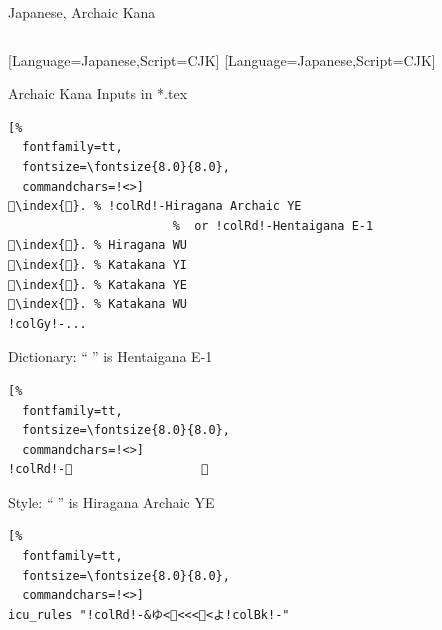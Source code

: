 \documentclass[aspectratio=169,10pt]{beamer}
\begin{document}

\begin{frame}[fragile]{Japanese, Archaic Kana}

\begin{columns}
\begin{column}{55mm}

\setmonofont{mkanaplus-regular.ttf}[Language=Japanese,Script=CJK]
\setsansfont{mkanaplus-regular.ttf}[Language=Japanese,Script=CJK]
\begin{exampleblock}{Archaic Kana Inputs in *.tex}
\begin{Verbatim}[%
  fontfamily=tt,
  fontsize=\fontsize{8.0}{8.0},
  commandchars=!<>]
𛀁\index{𛀁}. % !colRd!-Hiragana Archaic YE
                       %  or !colRd!-Hentaigana E-1
𛄟\index{𛄟}. % Hiragana WU
𛄠\index{𛄠}. % Katakana YI
𛄡\index{𛄡}. % Katakana YE
𛄢\index{𛄢}. % Katakana WU
!colGy!-...
\end{Verbatim}
\end{exampleblock}
\begin{exampleblock}{Dictionary: \footnotesize ``𛀁'' is Hentaigana E-1}
\begin{Verbatim}[%
  fontfamily=tt,
  fontsize=\fontsize{8.0}{8.0},
  commandchars=!<>]
!colRd!-𛀁                  え
\end{Verbatim}
\end{exampleblock}
\begin{exampleblock}{Style: \footnotesize ``𛀁'' is Hiragana Archaic YE}
\begin{Verbatim}[%
  fontfamily=tt,
  fontsize=\fontsize{8.0}{8.0},
  commandchars=!<>]
icu_rules "!colRd!-&ゆ<𛀁<<<𛄡<よ!colBk!-"
\end{Verbatim}
\end{exampleblock}
\end{column}

\begin{column}{38mm}
\begin{center}
\end{center}
\end{column}

\begin{column}{38mm}
\begin{center}
\end{center}
\end{column}
\end{columns}

\end{frame}
\end{document}
